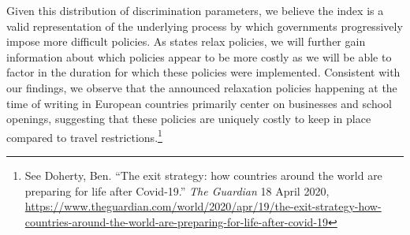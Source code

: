 \documentclass[]{article}
\let\rmarkdownfootnote\footnote%
\def\footnote{\protect\rmarkdownfootnote}
\begin{document}
Given this distribution of discrimination parameters, we believe the index is a valid representation of the underlying process by which governments progressively impose more difficult policies. As states relax policies, we will further gain information about which policies appear to be more costly as we will be able to factor in the duration for which these policies were implemented. Consistent with our findings, we observe that the announced relaxation policies happening at the time of writing in European countries primarily center on businesses and school openings, suggesting that these policies are uniquely costly to keep in place compared to travel restrictions.\footnote{See Doherty, Ben. ``The exit strategy: how countries around the world are preparing for life after Covid-19.'' \emph{The Guardian} 18 April 2020, \url{https://www.theguardian.com/world/2020/apr/19/the-exit-strategy-how-countries-around-the-world-are-preparing-for-life-after-covid-19}}

\begingroup\fontsize{9}{11}\selectfont
\end{document}

